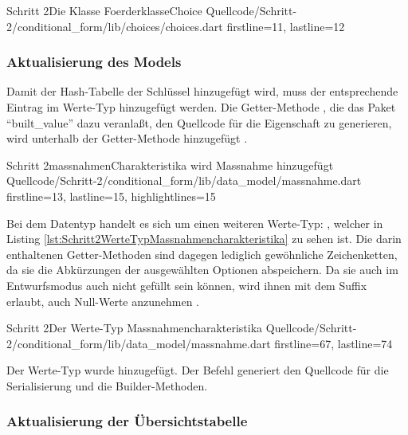 \begin{alexlisting}{Schritt 2}{Die Klasse FoerderklasseChoice}
  {Quellcode/Schritt-2/conditional_form/lib/choices/choices.dart}
  {firstline=11, lastline=12}
  \label{lst:Schritt2KlasseFoerderklasseChoice}
\end{alexlisting}

\subsubsection{Aktualisierung des Models}

Damit der Hash-Tabelle der Schlüssel  hinzugefügt wird, muss der entsprechende Eintrag im Werte-Typ  hinzugefügt werden.
Die Getter-Methode , die das Paket \enquote{built_value} dazu veranlaßt, den Quellcode für die Eigenschaft zu generieren, wird unterhalb der Getter-Methode  hinzugefügt .

\begin{alexlisting}{Schritt 2}{massnahmenCharakteristika wird Massnahme hinzugefügt}
  {Quellcode/Schritt-2/conditional_form/lib/data_model/massnahme.dart}
  {firstline=13, lastline=15, highlightlines={15}}
  \label{lst:Schritt2massnahmenCharakteristikaWirdMMassnahmeHinzugefuegt}
\end{alexlisting}

Bei dem Datentyp handelt es sich um einen weiteren Werte-Typ: , welcher in Listing \ref{lst:Schritt2WerteTypMassnahmencharakteristika} zu sehen ist.
Die darin enthaltenen Getter-Methoden sind dagegen lediglich gewöhnliche Zeichenketten, da sie die Abkürzungen der ausgewählten Optionen abspeichern.
Da sie auch im Entwurfsmodus auch nicht gefüllt sein können, wird ihnen mit dem Suffix  erlaubt, auch Null-Werte anzunehmen .

\begin{alexlisting}{Schritt 2}{Der Werte-Typ Massnahmencharakteristika}
  {Quellcode/Schritt-2/conditional_form/lib/data_model/massnahme.dart}
  {firstline=67, lastline=74}
  \label{lst:Schritt2WerteTypMassnahmencharakteristika}
\end{alexlisting}

Der Werte-Typ wurde hinzugefügt.
Der Befehl  generiert den Quellcode für die Serialisierung und die Builder-Methoden.

\subsubsection{Aktualisierung der Übersichtstabelle}

